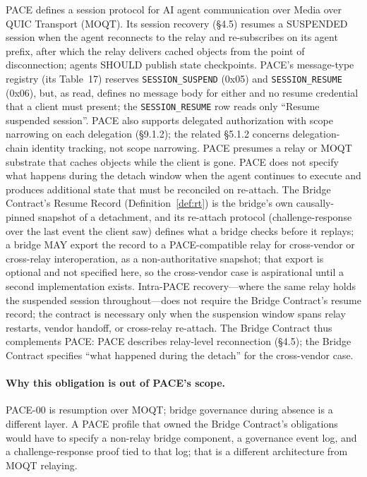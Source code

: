 PACE \cite{I-D.nandakumar-agentproto-moq-pace} defines a session protocol
for AI agent communication over Media over QUIC Transport (MOQT). Its
session recovery (\S 4.5) resumes a SUSPENDED session when the agent
reconnects to the relay and re-subscribes on its agent prefix, after which
the relay delivers cached objects from the point of disconnection; agents
SHOULD publish state checkpoints. PACE's message-type registry (its
Table~17) reserves \texttt{SESSION\_SUSPEND} (0x05) and
\texttt{SESSION\_RESUME} (0x06), but, as read, defines no message body
for either and no resume credential that a client must present; the
\texttt{SESSION\_RESUME} row reads only ``Resume suspended session''.
PACE also supports delegated authorization with scope narrowing on each
delegation (\S 9.1.2); the related \S 5.1.2 concerns delegation-chain
identity tracking, not scope narrowing. PACE presumes a relay or
MOQT substrate that caches objects while the client is gone. PACE does not specify what happens during the detach window when
the agent continues to execute and produces additional state that must be
reconciled on re-attach. The Bridge Contract's Resume Record (Definition~\ref{def:rt}) is the
bridge's own causally-pinned snapshot of a detachment, and its re-attach
protocol (challenge-response over the last event the client saw)
defines what a bridge checks before it replays; a bridge MAY export the
record to a PACE-compatible relay for cross-vendor or cross-relay
interoperation, as a non-authoritative snapshot; that export is optional and not
specified here, so the cross-vendor case is aspirational until a second
implementation exists. Intra-PACE recovery---where the same relay
holds the suspended session throughout---does not require the Bridge
Contract's resume record; the contract is necessary only
when the suspension window spans relay restarts, vendor handoff, or
cross-relay re-attach. The Bridge Contract thus complements PACE: PACE
describes relay-level reconnection (\S 4.5); the Bridge Contract specifies ``what
happened during the detach'' for the cross-vendor case.

\paragraph{Why this obligation is out of PACE's scope.}
PACE-00 is resumption over MOQT; bridge governance during absence is
a different layer. A PACE profile that owned the Bridge Contract's
obligations would have to specify a non-relay bridge component, a
governance event log, and a challenge-response proof tied to that
log; that is a different architecture from MOQT relaying.

